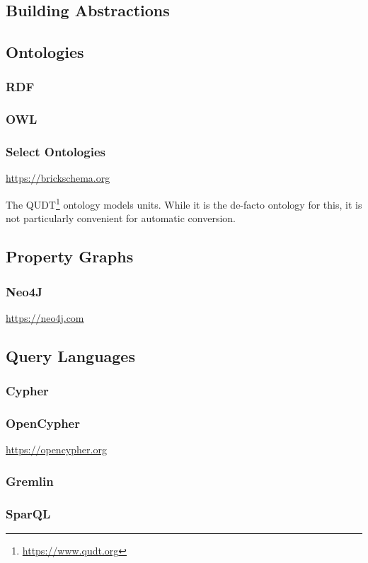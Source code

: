 \subsection{Building Abstractions}




\subsection{Ontologies}
\subsubsection{RDF}
\subsubsection{OWL}
\subsubsection{Select Ontologies}

\url{https://brickschema.org}



The QUDT\footnote{\url{https://www.qudt.org}} ontology models units. While it is the de-facto ontology for this, it is not particularly convenient for automatic conversion.

\subsection{Property Graphs}
\subsubsection{Neo4J}

\url{https://neo4j.com}

\subsection{Query Languages}
\subsubsection{Cypher}
\subsubsection{OpenCypher}

\url{https://opencypher.org}

\subsubsection{Gremlin}
\subsubsection{SparQL}



